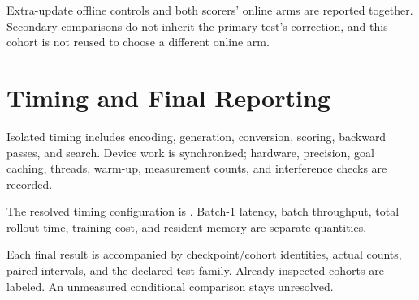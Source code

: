 Extra-update offline controls and both scorers' online arms are reported together. Secondary comparisons do not inherit the primary test's correction, and this cohort is not reused to choose a different online arm.

\section{Timing and Final Reporting}
\label{app:reporting}
Isolated timing includes encoding, generation, conversion, scoring, backward passes, and search. Device work is synchronized; hardware, precision, goal caching, threads, warm-up, measurement counts, and interference checks are recorded.

The resolved timing configuration is . Batch-1 latency, batch throughput, total rollout time, training cost, and resident memory are separate quantities.

Each final result is accompanied by checkpoint/cohort identities, actual counts, paired intervals, and the declared test family. Already inspected cohorts are labeled. An unmeasured conditional comparison stays unresolved.


